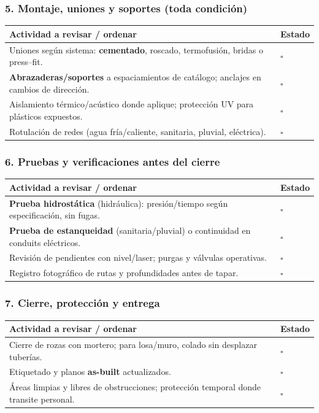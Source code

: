\documentclass[12pt]{article}
\newcommand{\cbox}{\(\square\)} %
\begin{document}
	\subsubsection*{5. Montaje, uniones y soportes (toda condición)}
	\begin{tabularx}{\linewidth}{>{\raggedright\arraybackslash}p{0.93\linewidth} >{\centering\arraybackslash}m{0.07\linewidth}}
		\toprule
		\textbf{Actividad a revisar / ordenar} & \textbf{Estado}\\
		\midrule
		Uniones según sistema: \textbf{cementado}, roscado, termofusión, bridas o press–fit. & \cbox \\
		\textbf{Abrazaderas/soportes} a espaciamientos de catálogo; anclajes en cambios de dirección. & \cbox \\
		Aislamiento térmico/acústico donde aplique; protección UV para plásticos expuestos. & \cbox \\
		Rotulación de redes (agua fría/caliente, sanitaria, pluvial, eléctrica). & \cbox \\
		\bottomrule
	\end{tabularx}
	
	\subsubsection*{6. Pruebas y verificaciones antes del cierre}
	\begin{tabularx}{\linewidth}{>{\raggedright\arraybackslash}p{0.93\linewidth} >{\centering\arraybackslash}m{0.07\linewidth}}
		\toprule
		\textbf{Actividad a revisar / ordenar} & \textbf{Estado}\\
		\midrule
		\textbf{Prueba hidrostática} (hidráulica): presión/tiempo según especificación, sin fugas. & \cbox \\
		\textbf{Prueba de estanqueidad} (sanitaria/pluvial) o continui\-dad en conduits eléctricos. & \cbox \\
		Revisión de pendientes con nivel/laser; purgas y válvulas operativas. & \cbox \\
		Registro fotográfico de rutas y profundidades antes de tapar. & \cbox \\
		\bottomrule
	\end{tabularx}
	
	\subsubsection*{7. Cierre, protección y entrega}
	\begin{tabularx}{\linewidth}{>{\raggedright\arraybackslash}p{0.93\linewidth} >{\centering\arraybackslash}m{0.07\linewidth}}
		\toprule
		\textbf{Actividad a revisar / ordenar} & \textbf{Estado}\\
		\midrule
		Cierre de rozas con mortero; para losa/muro, colado sin desplazar tuberías. & \cbox \\
		Etiquetado y planos \textbf{as-built} actualizados. & \cbox \\
		Áreas limpias y libres de obstrucciones; protección temporal donde transite personal. & \cbox \\
		\bottomrule
	\end{tabularx}
	
\end{document}
